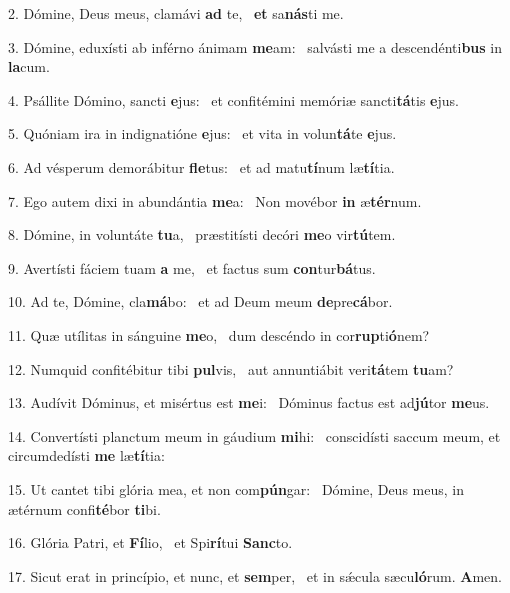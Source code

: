 2. Dómine, Deus meus, clamávi \textbf{ad} te, \ast\  \textbf{et} sa\textbf{nás}ti me.\

3. Dómine, eduxísti ab inférno ánimam \textbf{me}am: \ast\  salvásti me a descendénti\textbf{bus} in \textbf{la}cum.\

4. Psállite Dómino, sancti \textbf{e}jus: \ast\  et confitémini memóriæ sancti\textbf{tá}tis \textbf{e}jus.\

5. Quóniam ira in indignatióne \textbf{e}jus: \ast\  et vita in volun\textbf{tá}te \textbf{e}jus.\

6. Ad vésperum demorábitur \textbf{fle}tus: \ast\  et ad matu\textbf{tí}num læ\textbf{tí}tia.\

7. Ego autem dixi in abundántia \textbf{me}a: \ast\  Non movébor \textbf{in} æ\textbf{tér}num.\

8. Dómine, in voluntáte \textbf{tu}a, \ast\  præstitísti decóri \textbf{me}o vir\textbf{tú}tem.\

9. Avertísti fáciem tuam \textbf{a} me, \ast\  et factus sum \textbf{con}tur\textbf{bá}tus.\

10. Ad te, Dómine, cla\textbf{má}bo: \ast\  et ad Deum meum \textbf{de}pre\textbf{cá}bor.\

11. Quæ utílitas in sánguine \textbf{me}o, \ast\  dum descéndo in cor\textbf{rup}ti\textbf{ó}nem?\

12. Numquid confitébitur tibi \textbf{pul}vis, \ast\  aut annuntiábit veri\textbf{tá}tem \textbf{tu}am?\

13. Audívit Dóminus, et misértus est \textbf{me}i: \ast\  Dóminus factus est ad\textbf{jú}tor \textbf{me}us.\

14. Convertísti planctum meum in gáudium \textbf{mi}hi: \ast\  conscidísti saccum meum, et circumdedísti \textbf{me} læ\textbf{tí}tia:\

15. Ut cantet tibi glória mea, et non com\textbf{pún}gar: \ast\  Dómine, Deus meus, in ætérnum confi\textbf{té}bor \textbf{ti}bi.\

16. Glória Patri, et \textbf{Fí}lio, \ast\  et Spi\textbf{rí}tui \textbf{Sanc}to.\

17. Sicut erat in princípio, et nunc, et \textbf{sem}per, \ast\  et in sǽcula sæcu\textbf{ló}rum. \textbf{A}men.\

